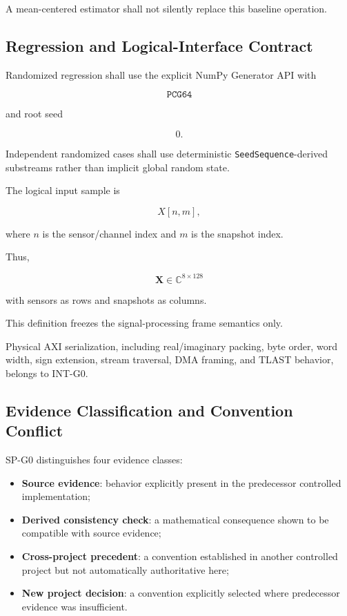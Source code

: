 A mean-centered estimator shall not silently replace this baseline operation.

\subsection{Regression and Logical-Interface Contract}

Randomized regression shall use the explicit NumPy Generator API with

\[
\texttt{PCG64}
\]

and root seed

\[
0.
\]

Independent randomized cases shall use deterministic
\texttt{SeedSequence}-derived substreams rather than implicit global random
state.

The logical input sample is

\[
X[n,m],
\]

where \(n\) is the sensor/channel index and \(m\) is the snapshot index.

Thus,

\[
\mathbf X\in\mathbb C^{8\times128}
\]

with sensors as rows and snapshots as columns.

This definition freezes the signal-processing frame semantics only.

Physical AXI serialization, including real/imaginary packing, byte order,
word width, sign extension, stream traversal, DMA framing, and TLAST
behavior, belongs to INT-G0.

\subsection{Evidence Classification and Convention Conflict}

SP-G0 distinguishes four evidence classes:

\begin{itemize}
    \item \textbf{Source evidence}: behavior explicitly present in the
    predecessor controlled implementation;

    \item \textbf{Derived consistency check}: a mathematical consequence
    shown to be compatible with source evidence;

    \item \textbf{Cross-project precedent}: a convention established in
    another controlled project but not automatically authoritative here;

    \item \textbf{New project decision}: a convention explicitly selected
    where predecessor evidence was insufficient.
\end{itemize}

